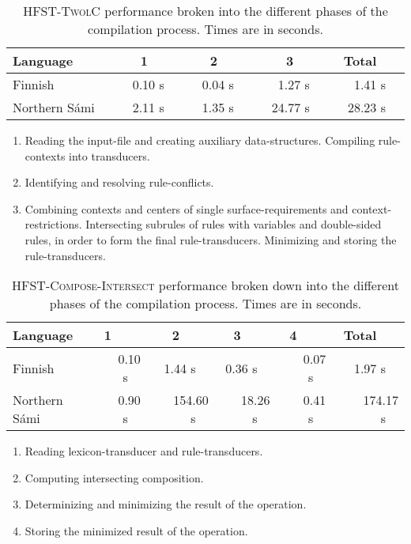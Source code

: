\documentclass[postprint]{flammie}
\begin{document}
\begin{table}[!h]
  \begin{center}
    \begin{tabular}{l|rrr|r}
      \hline
      Language & 1~~~~ & 2~~~~ & 3~~~~ & Total~~~ \\
      \hline
      Finnish & ~~0.10 s~~ & ~~0.04 s~~ & 1.27 s~~ & 1.41 s~~ \\
      Northern S\'ami~~ & 2.11 s~~ & 1.35 s~~ & ~~24.77 s~~ & ~~28.23 s~~ \\
      \hline
    \end{tabular}
    \vskip0.5cm
    \begin{enumerate}
    \item Reading the input-file and creating auxiliary
    data-structures. Compiling rule-contexts into transducers.
    \item Identifying and resolving rule-conflicts.
    \item Combining contexts and centers of single
    surface-requirements and context-restrictions. Intersecting subrules
    of rules with variables and double-sided rules, in order to form
    the final rule-transducers. Minimizing and storing the
    rule-transducers.
    \end{enumerate}
    \caption{\textsc{HFST-TwolC} performance broken into the different
    phases of the compilation process. Times are in
    seconds.}\label{fig:grammar-compilation-phases}
  \end{center}
\end{table}

\begin{table}[!h]
  \begin{center}
    \begin{tabular}{l|rrrr|r}
      \hline
      Language & 1~~~~ & 2~~~~ & 3~~~~ & 4~~~~ & Total~~~ \\
      \hline
      Finnish & 0.10 s~~ & 1.44 s~~ & 0.36 s~~ & 0.07 s~~ & 1.97 s~~ \\
      Northern S\'ami~~ & ~~0.90 s~~ & ~~154.60 s~~ & ~~18.26 s~~ & ~~0.41 s~~ & ~~174.17 s~~ \\
      \hline
    \end{tabular}
    \vskip0.5cm
    \begin{enumerate}
    \item Reading lexicon-transducer and rule-transducers.
    \item Computing intersecting composition.
    \item Determinizing and minimizing the result of the operation.
    \item Storing the minimized result of the operation.
    \end{enumerate}
    \caption{\textsc{HFST-Compose-Intersect} performance broken down
    into the different phases of the compilation process. Times are in
    seconds.}\label{fig:ci-phases}
  \end{center}
\end{table}
\end{document}
